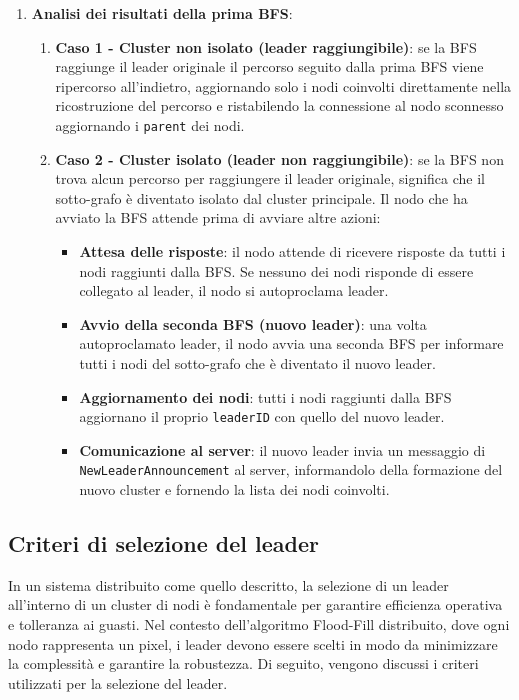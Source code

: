 \documentclass[12pt, a4paper]{report}
\begin{document}
\begin{itemize}
\begin{enumerate}
        \item \textbf{Analisi dei risultati della prima BFS}:
        \begin{enumerate}
            \item \textbf{Caso 1 - Cluster non isolato (leader raggiungibile)}: se la BFS raggiunge il leader originale il percorso seguito dalla prima BFS viene ripercorso all'indietro, aggiornando solo i nodi coinvolti direttamente nella ricostruzione del percorso e ristabilendo la connessione al nodo sconnesso aggiornando i \texttt{parent} dei nodi.

            \item \textbf{Caso 2 - Cluster isolato (leader non raggiungibile)}: se la BFS non trova alcun percorso per raggiungere il leader originale, significa che il sotto-grafo \`e diventato isolato dal cluster principale. Il nodo che ha avviato la BFS attende prima di avviare altre azioni:
            \begin{itemize}
                \item \textbf{Attesa delle risposte}: il nodo attende di ricevere risposte da tutti i nodi raggiunti dalla BFS. Se nessuno dei nodi risponde di essere collegato al leader, il nodo si autoproclama leader.
                \item \textbf{Avvio della seconda BFS (nuovo leader)}: una volta autoproclamato leader, il nodo avvia una seconda BFS per informare tutti i nodi del sotto-grafo che \`e diventato il nuovo leader.
                \item \textbf{Aggiornamento dei nodi}: tutti i nodi raggiunti dalla BFS aggiornano il proprio \texttt{leaderID} con quello del nuovo leader.
                \item \textbf{Comunicazione al server}: il nuovo leader invia un messaggio di \\ \texttt{NewLeaderAnnouncement} al server, informandolo della formazione del nuovo cluster e fornendo la lista dei nodi coinvolti.
            \end{itemize}
        \end{enumerate}
    \end{enumerate}
\end{itemize}

\subsection{Criteri di selezione del leader}

In un sistema distribuito come quello descritto, la selezione di un leader all'interno di un cluster di nodi \`e fondamentale per garantire efficienza operativa e tolleranza ai guasti. Nel contesto dell'algoritmo Flood-Fill distribuito, dove ogni nodo rappresenta un pixel, i leader devono essere scelti in modo da minimizzare la complessit\`a e garantire la robustezza. Di seguito, vengono discussi i criteri utilizzati per la selezione del leader.
\end{document}
